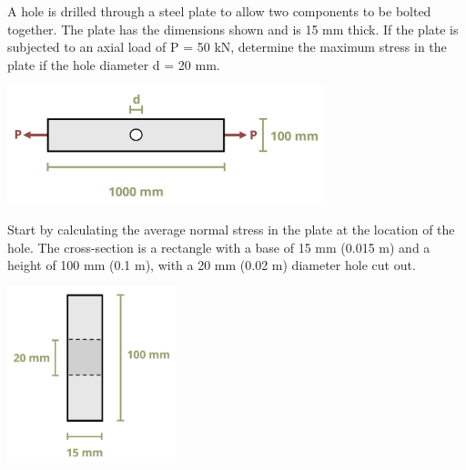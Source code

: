 \documentclass[
  letterpaper,
  DIV=11,
  numbers=noendperiod]{scrreprt}
\theoremstyle{definition}
\theoremstyle{remark}
\begin{document}
\begin{tcolorbox}[enhanced jigsaw, leftrule=.75mm, colbacktitle=quarto-callout-tip-color!10!white, breakable, opacityback=0, colback=white, titlerule=0mm, toprule=.15mm, colframe=quarto-callout-tip-color-frame, coltitle=black, title={Example 5.1}, toptitle=1mm, bottomrule=.15mm, rightrule=.15mm, left=2mm, arc=.35mm, opacitybacktitle=0.6, bottomtitle=1mm]

A hole is drilled through a steel plate to allow two components to be
bolted together. The plate has the dimensions shown and is 15 mm thick.
If the plate is subjected to an axial load of P = 50 kN, determine the
maximum stress in the plate if the hole diameter d = 20 mm.

\begin{center}
\includegraphics[width=3.625in,height=\textheight]{images/PNGs/Example 5.1 part 1.png}
\end{center}

\begin{tcolorbox}[enhanced jigsaw, leftrule=.75mm, colbacktitle=quarto-callout-tip-color!10!white, breakable, opacityback=0, colback=white, titlerule=0mm, toprule=.15mm, colframe=quarto-callout-tip-color-frame, coltitle=black, title={Solution}, toptitle=1mm, bottomrule=.15mm, rightrule=.15mm, left=2mm, arc=.35mm, opacitybacktitle=0.6, bottomtitle=1mm]

Start by calculating the average normal stress in the plate at the
location of the hole. The cross-section is a rectangle with a base of 15
mm (0.015 m) and a height of 100 mm (0.1 m), with a 20 mm (0.02 m)
diameter hole cut out.

\begin{center}
\includegraphics[width=1.92708in,height=\textheight]{images/PNGs/Example 5.1 part 2.png}
\end{center}


\end{tcolorbox}
\end{tcolorbox}
\end{document}
